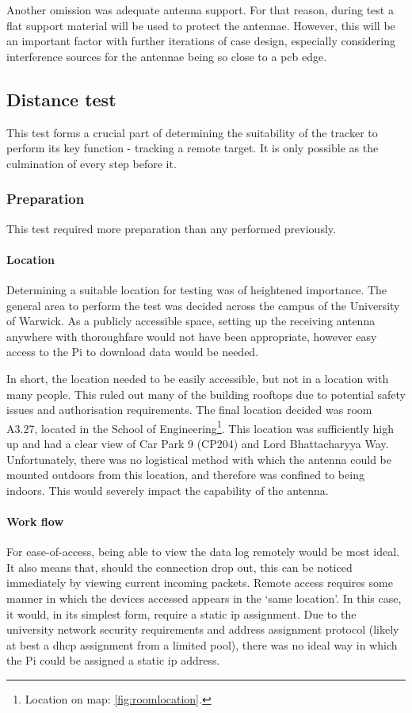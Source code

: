 Another omission was adequate antenna support. For that reason, during test a flat support
material will be used to protect the antennae. However, this will be an important 
factor with further iterations of case design, especially considering interference sources 
for the antennae being so close to a \acrshort{pcb} edge. 

\subsection{Distance test}
This test forms a crucial part of determining the suitability of the tracker to
perform its key function - tracking a remote target. It is only possible as the
culmination of every step before it.

\subsubsection{Preparation}
This test required more preparation than any performed previously.

\paragraph{Location}
Determining a suitable location for testing was of heightened importance.
The general area to perform the test was decided across the campus of the
University of Warwick. As a publicly accessible space, setting up the receiving
antenna anywhere with thoroughfare would not have been appropriate, however
easy access to the Pi to download data would be needed.

In short, the location needed to be easily accessible, but not in a location
with many people. This ruled out many of the building rooftops due to
potential safety issues and authorisation requirements. The final location
decided was room A3.27, located in the School of Engineering\footnote{
    Location on map: \cref{fig:roomlocation}.
}. This location
was sufficiently high up and had a clear view of Car Park 9 (CP204) and
Lord Bhattacharyya Way. Unfortunately, there was no logistical method with
which the antenna could be mounted outdoors from this location, and therefore
was confined to being indoors. This would severely impact the capability of the antenna.

\paragraph{Work flow}
For ease-of-access, being able to view the data log remotely would be most ideal.
It also means that, should the connection drop out, this can be noticed immediately by
viewing current incoming packets. Remote access requires some manner in which the devices
accessed appears in the `same location'. In this case, it would, in its simplest form,
require a static \acrshort{ip} assignment.
Due to the university network security requirements and address assignment protocol
(likely at best a \acrshort{dhcp} assignment from a limited pool),
there was no ideal way in which the Pi
could be assigned a static \acrshort{ip} address.

